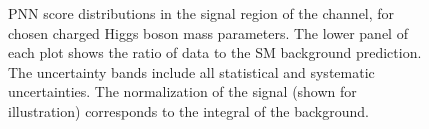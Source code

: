 		\begin{figure}
		  \centering
			  \caption{\label{fig:taujets_SR_PNNscores_body-2} \gls{PNN} score distributions in the
			signal region of the \taujets channel, for chosen charged Higgs boson mass parameters.
			The lower panel of each plot shows the ratio of data to the \acrshort{SM} background prediction. The uncertainty bands include all statistical and systematic uncertainties. 
			The normalization of the signal (shown for illustration) corresponds to the integral of the background.}
		\end{figure}

